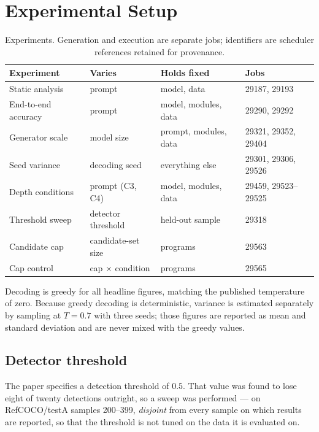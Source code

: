 \documentclass[12pt,a4paper,oneside]{report}
\begin{document}
\chapter{Experimental Setup}
\label{ch:setup}

\begin{table}[htbp]\centering
\caption{Experiments. Generation and execution are separate jobs; identifiers are
scheduler references retained for provenance.}
\label{tab:experiments}
\begin{tabular}{@{}llll@{}}
\toprule
\textbf{Experiment} & \textbf{Varies} & \textbf{Holds fixed} & \textbf{Jobs} \\
\midrule
Static analysis & prompt & model, data & 29187, 29193 \\
End-to-end accuracy & prompt & model, modules, data & 29290, 29292 \\
Generator scale & model size & prompt, modules, data & 29321, 29352, 29404 \\
Seed variance & decoding seed & everything else & 29301, 29306, 29526 \\
Depth conditions & prompt (C3, C4) & model, modules, data & 29459, 29523--29525 \\
Threshold sweep & detector threshold & held-out sample & 29318 \\
Candidate cap & candidate-set size & programs & 29563 \\
Cap control & cap $\times$ condition & programs & 29565 \\
\bottomrule
\end{tabular}
\end{table}

Decoding is greedy for all headline figures, matching the published temperature of
zero. Because greedy decoding is deterministic, variance is estimated separately by
sampling at $T = 0.7$ with three seeds; those figures are reported as mean and standard
deviation and are never mixed with the greedy values.

\section{Detector threshold}

The paper specifies a detection threshold of $0.5$. That value was found to lose eight
of twenty detections outright, so a sweep was performed --- on RefCOCO/testA samples
200--399, \emph{disjoint} from every sample on which results are reported, so that the
threshold is not tuned on the data it is evaluated on.
\end{document}
